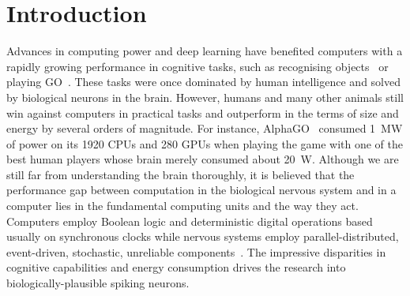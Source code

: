 \documentclass{article}
\begin{document}
\begin{abstract}
 
\end{abstract}

\section{Introduction}
Advances in computing power and deep learning have benefited computers with a rapidly growing performance in cognitive tasks, such as recognising objects~\cite{deng2009imagenet} or playing GO~\cite{silver2016mastering}. 
These tasks were once dominated by human intelligence and solved by biological neurons in the brain.
However, humans and many other animals still win against computers in practical tasks and outperform in the terms of size and energy by several orders of magnitude.
For instance, AlphaGO~\cite{silver2016mastering} consumed 1~MW of power on its 1920 CPUs and 280 GPUs when playing the game with one of the best human players whose brain merely consumed about 20~W.
Although we are still far from understanding the brain thoroughly, it is believed that the performance gap between computation in the biological nervous system and in a computer lies in the fundamental computing units and the way they act.
Computers employ Boolean logic and deterministic digital operations based usually on synchronous clocks while nervous systems employ parallel-distributed, event-driven, stochastic, unreliable components~\cite{indiveri2009artificial}.
The impressive disparities in cognitive capabilities and energy consumption drives the research into biologically-plausible spiking neurons.
\end{document}
